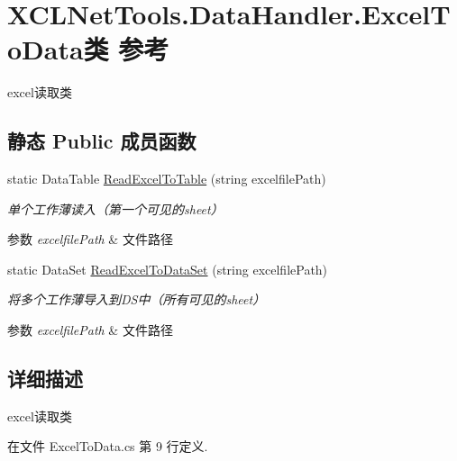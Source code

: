 \hypertarget{class_x_c_l_net_tools_1_1_data_handler_1_1_excel_to_data}{\section{X\-C\-L\-Net\-Tools.\-Data\-Handler.\-Excel\-To\-Data类 参考}
\label{class_x_c_l_net_tools_1_1_data_handler_1_1_excel_to_data}
}


excel读取类  


\subsection*{静态 Public 成员函数}
\begin{DoxyCompactItemize}
\item 
static Data\-Table \hyperlink{class_x_c_l_net_tools_1_1_data_handler_1_1_excel_to_data_adbc7d208ff0dbc770c7cf52d6a6f3673}{Read\-Excel\-To\-Table} (string excelfile\-Path)
\begin{DoxyCompactList}\small\item\em 单个工作薄读入（第一个可见的sheet） 
\begin{DoxyParams}{参数}
{\em excelfile\-Path} & 文件路径\\
\hline
\end{DoxyParams}
\end{DoxyCompactList}\item 
static Data\-Set \hyperlink{class_x_c_l_net_tools_1_1_data_handler_1_1_excel_to_data_ae7cfc36013815d61fbad11460386541f}{Read\-Excel\-To\-Data\-Set} (string excelfile\-Path)
\begin{DoxyCompactList}\small\item\em 将多个工作薄导入到\-D\-S中（所有可见的sheet） 
\begin{DoxyParams}{参数}
{\em excelfile\-Path} & 文件路径\\
\hline
\end{DoxyParams}
\end{DoxyCompactList}\end{DoxyCompactItemize}


\subsection{详细描述}
excel读取类 



在文件 Excel\-To\-Data.\-cs 第 9 行定义.



